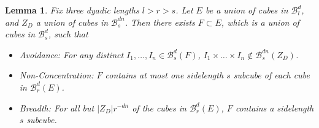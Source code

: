 \documentclass[dvipsnames]{article}
\theoremstyle{plain}
\newtheorem{lemma}{Lemma}
\theoremstyle{plain}
\begin{document}
\begin{lemma}
	Fix three dyadic lengths $l > r > s$. Let $E$ be a union of cubes in $\mathcal{B}^d_l$, and $Z_D$ a union of cubes in $\mathcal{B}^{dn}_s$. Then there exists $F \subset E$, which is a union of cubes in $\mathcal{B}^d_s$, such that
	\begin{itemize}
		\item \emph{Avoidance}:  For any distinct $I_1, \dots, I_n \in \mathcal{B}^d_s(F)$, $I_1 \times \dots \times I_n \not \in \mathcal{B}^{dn}_s(Z_D)$.
		\item \emph{Non-Concentration}: $F$ contains at most one sidelength $s$ subcube of each cube in $\mathcal{B}^d_r(E)$.
		\item \emph{Breadth}: For all but $|Z_D| r^{-dn}$ of the cubes in $\mathcal{B}^d_r(E)$, $F$ contains a sidelength $s$ subcube.
	\end{itemize}
\end{lemma}
\end{document}
